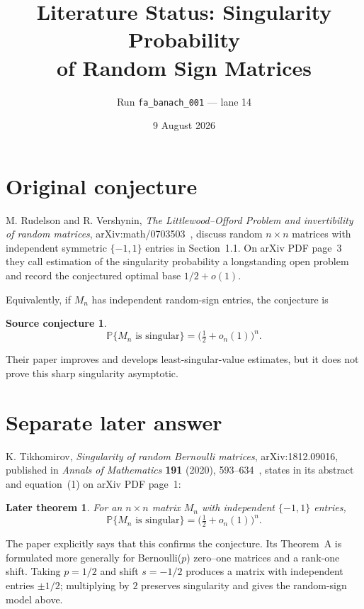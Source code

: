 \documentclass[11pt]{article}
\title{Literature Status: Singularity Probability\\of Random Sign Matrices}
\author{Run \texttt{fa\_banach\_001} --- lane 14}
\date{9 August 2026}
\newtheorem*{question}{Source conjecture}
\newtheorem*{answer}{Later theorem}
\begin{document}
\maketitle

\begin{center}
\end{center}

\section{Original conjecture}

M. Rudelson and R. Vershynin,
\emph{The Littlewood--Offord Problem and invertibility of random matrices},
arXiv:math/0703503~\cite{source}, discuss random $n\times n$ matrices with
independent symmetric $\{-1,1\}$ entries in Section~1.1.  On arXiv PDF
page~3 they call estimation of the singularity probability a longstanding
open problem and record the conjectured optimal base $1/2+o(1)$.

Equivalently, if $M_n$ has independent random-sign entries, the conjecture is
\begin{question}
\[
 \mathbb P\{M_n\text{ is singular}\}
   =\bigl(\tfrac12+o_n(1)\bigr)^n.
\]
\end{question}
Their paper improves and develops least-singular-value estimates, but it does
not prove this sharp singularity asymptotic.

\section{Separate later answer}

K. Tikhomirov,
\emph{Singularity of random Bernoulli matrices}, arXiv:1812.09016,
published in \emph{Annals of Mathematics} \textbf{191} (2020),
593--634~\cite{answerpaper}, states in its abstract and equation~(1) on
arXiv PDF page~1:

\begin{answer}
For an $n\times n$ matrix $M_n$ with independent $\{-1,1\}$ entries,
\[
 \mathbb P\{M_n\text{ is singular}\}
   =\bigl(\tfrac12+o_n(1)\bigr)^n.
\]
\end{answer}

The paper explicitly says that this confirms the conjecture.  Its Theorem~A
is formulated more generally for Bernoulli($p$) zero--one matrices and a
rank-one shift.  Taking $p=1/2$ and shift $s=-1/2$ produces a matrix with
independent entries $\pm 1/2$; multiplying by $2$ preserves singularity and
gives the random-sign model above.
\end{document}
